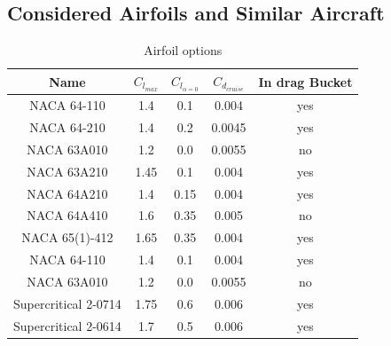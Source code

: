 \documentclass[conf]{new-aiaa}
\begin{document}
\subsection*{Considered Airfoils and Similar Aircraft}
\begin{table}[H]
    \centering
    \caption{Airfoil options}
    \label{tab:AirfoilOptions}
    \begin{tabular}{|c|c|c|c|c|} \hline
        Name & $C_{l_{max}}$ & $C_{l_{\alpha=0}}$ & $C_{d_{cruise}}$ & In drag Bucket \\ \hline
        NACA 64-110          & 1.4  & 0.1  & 0.004  & yes \\ \hline
        NACA 64-210          & 1.4  & 0.2  & 0.0045 & yes \\ \hline
        NACA 63A010          & 1.2  & 0.0  & 0.0055 & no  \\ \hline
        NACA 63A210          & 1.45 & 0.1  & 0.004  & yes \\ \hline
        NACA 64A210          & 1.4  & 0.15 & 0.004  & yes \\ \hline
        NACA 64A410          & 1.6  & 0.35 & 0.005  & no  \\ \hline
        NACA 65(1)-412       & 1.65 & 0.35 & 0.004  & yes \\ \hline
        NACA 64-110          & 1.4  & 0.1  & 0.004  & yes \\ \hline
        NACA 63A010          & 1.2  & 0.0  & 0.0055 & no  \\ \hline
        Supercritical 2-0714 & 1.75 & 0.6  & 0.006  & yes \\ \hline
        Supercritical 2-0614 & 1.7  & 0.5  & 0.006  & yes \\ \hline
    \end{tabular}
\end{table}
\end{document}
